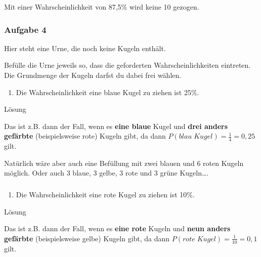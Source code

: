 \documentclass[
  ngerman,
]{book}
\providecommand{\tightlist}{%
  \setlength{\itemsep}{0pt}\setlength{\parskip}{0pt}}
\begin{document}
Mit einer Wahrscheinlichkeit von 87,5\% wird keine 10 gezogen.

\hypertarget{section-96}{%
\subsubsection*{}\label{section-96}}

\hypertarget{aufgabe-4-1}{%
\subsubsection*{Aufgabe 4}\label{aufgabe-4-1}}

Hier steht eine Urne, die noch keine Kugeln enthält.

Befülle die Urne jeweils so, dass die geforderten Wahrscheinlichkeiten eintreten. Die Grundmenge der Kugeln darfst du dabei frei wählen.

\begin{enumerate}
\def\labelenumi{\alph{enumi})}
\tightlist
\item
  Die Wahrscheinlichkeit eine blaue Kugel zu ziehen ist 25\%.
\end{enumerate}

Lösung

Das ist z.B. dann der Fall, wenn es \textbf{eine blaue} Kugel und \textbf{drei anders gefärbte} (beispielsweise rote) Kugeln gibt, da dann \(P(blau\;Kugel)=\frac{1}{4}=0,25\) gilt.

Natürlich wäre aber auch eine Befüllung mit zwei blauen und 6 roten Kugeln möglich. Oder auch 3 blaue, 3 gelbe, 3 rote und 3 grüne Kugeln\ldots.

\hypertarget{section-97}{%
\subsubsection*{}\label{section-97}}

\begin{enumerate}
\def\labelenumi{\alph{enumi})}
\setcounter{enumi}{1}
\tightlist
\item
  Die Wahrscheinlichkeit eine rote Kugel zu ziehen ist 10\%.
\end{enumerate}

Lösung

Das ist z.B. dann der Fall, wenn es \textbf{eine rote} Kugeln und \textbf{neun anders gefärbte} (beispielsweise gelbe) Kugeln gibt, da dann \(P(rote\;Kugel)=\frac{1}{10}=0,1\) gilt.
\end{document}
